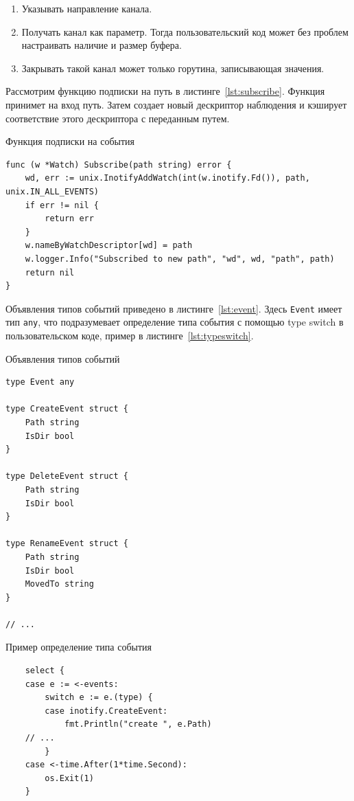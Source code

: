 \documentclass[14pt, russian]{scrartcl}
\newcommand{\code}[1]{\texttt{#1}}
\begin{document}
\begin{enumerate}
  \item Указывать направление канала.
  \item Получать канал как параметр. Тогда пользовательский код может без
        проблем настраивать наличие и размер буфера.
  \item Закрывать такой канал может только горутина, записывающая значения.
\end{enumerate}

Рассмотрим функцию подписки на путь в листинге~\ref{lst:subscribe}. Функция
принимет на вход путь. Затем создает новый дескриптор наблюдения и кэширует
соответствие этого дескриптора с переданным путем.

\begin{listing}[H]
\caption{Функция подписки на события}
\label{lst:subscribe}
\begin{verbatim}
func (w *Watch) Subscribe(path string) error {
	wd, err := unix.InotifyAddWatch(int(w.inotify.Fd()), path, unix.IN_ALL_EVENTS)
	if err != nil {
		return err
	}
	w.nameByWatchDescriptor[wd] = path
	w.logger.Info("Subscribed to new path", "wd", wd, "path", path)
	return nil
}
\end{verbatim}
\end{listing}

Объявления типов событий приведено в листинге~\ref{lst:event}. Здесь
\code{Event} имеет тип \code{any}, что подразумевает определение типа события с
помощью type switch в пользовательском коде, пример в листинге~\ref{lst:typeswitch}.

\begin{listing}[H]
\caption{Объявления типов событий}
\label{lst:event}
\begin{verbatim}
type Event any

type CreateEvent struct {
	Path string
	IsDir bool
}

type DeleteEvent struct {
	Path string
	IsDir bool
}

type RenameEvent struct {
	Path string
	IsDir bool
	MovedTo string
}

// ...

\end{verbatim}
\end{listing}

\begin{listing}[H]
\caption{Пример определение типа события}
\label{lst:typeswitch}
\begin{verbatim}
	select {
	case e := <-events:
		switch e := e.(type) {
		case inotify.CreateEvent:
			fmt.Println("create ", e.Path)
    // ...
		}
	case <-time.After(1*time.Second):
		os.Exit(1)
	}
\end{verbatim}
\end{listing}
\end{document}
